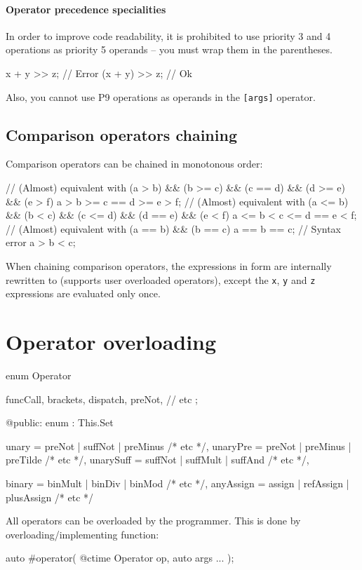 \paragraph{Operator precedence specialities}
In order to improve code readability, it is prohibited to use priority 3 and 4 operations as priority 5 operands -- you must wrap them in the parentheses.
\begin{code}
x + y >> z; // Error
(x + y) >> z; // Ok
\end{code}

Also, you cannot use P9 operations as operands in the \verb|[args]| operator.

\subsection{Comparison operators chaining} Comparison operators can be chained in monotonous order:
\begin{code}
// (Almost) equivalent with (a > b) && (b >= c) && (c == d) && (d >= e) && (e > f)
a > b >= c == d >= e > f;
// (Almost) equivalent with (a <= b) && (b < c) && (c <= d) && (d == e) && (e < f)
a <= b < c <= d == e < f;
// (Almost) equivalent with (a == b) && (b == c)
a == b == c;
// Syntax error
a > b < c;
\end{code}

When chaining comparison operators, the expressions in form  are internally rewritten to  (supports user overloaded operators), except the \verb|x|, \verb|y| and \verb|z| expressions are evaluated only once.

\section{Operator overloading}

\begin{code}
enum Operator {
	funcCall,
	brackets,
	dispatch,
	preNot,
	// etc
	;
	
@public:
	enum : This.Set {
		unary = preNot | suffNot | preMinus /* etc */,
		unaryPre = preNot | preMinus | preTilde /* etc */,
		unarySuff = suffNot | suffMult | suffAnd /* etc */,
		
		binary = binMult | binDiv | binMod /* etc */,
		anyAssign = assign | refAssign | plusAssign /* etc */
	}	
}
\end{code}

All operators can be overloaded by the programmer. This is done by overloading/implementing function:
\begin{code}
auto #operator( @ctime Operator op, auto args ... );
\end{code}

